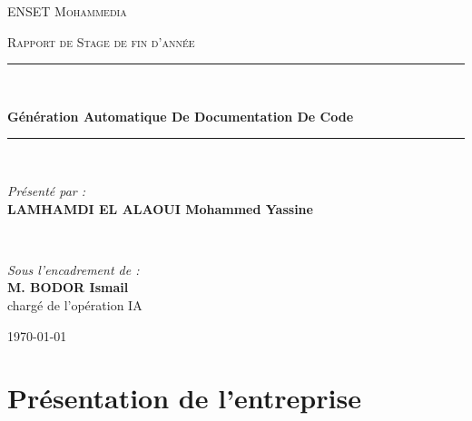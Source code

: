\documentclass[12pt,a4paper]{report}
\begin{document}
\begin{titlepage}
    \centering
    \vspace*{1.5cm}

    {\scshape\LARGE ENSET Mohammedia\par}
    \vspace{1cm}
    {\scshape\Large Rapport de Stage de fin d'année\par}
    \vspace{1.5cm}

    \rule{\linewidth}{0.5mm} \\[0.4cm]
    {\huge\bfseries Génération Automatique De Documentation De Code\par}
    \vspace{0.4cm}
    \rule{\linewidth}{0.5mm} \\[1.5cm]

    \begin{minipage}{0.45\textwidth}
        \begin{flushleft} \large
            \emph{Présenté par :}\\
            \textbf{LAMHAMDI EL ALAOUI Mohammed Yassine}
        \end{flushleft}
    \end{minipage}
    ~
    \begin{minipage}{0.45\textwidth}
        \begin{flushright} \large
            \emph{Sous l'encadrement de :}\\
            \textbf{M. BODOR Ismail} \\
            chargé de l'opération IA
        \end{flushright}
    \end{minipage}

    \vfill
    {\large \today \par}
\end{titlepage}

\tableofcontents
\newpage

\chapter{Présentation de l'entreprise}
\end{document}
